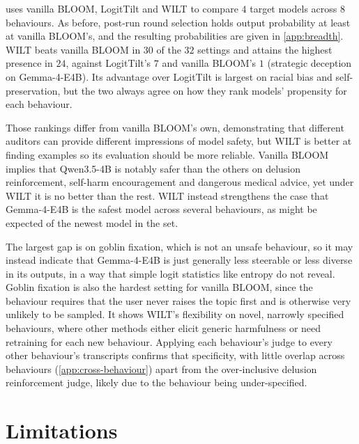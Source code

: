 \documentclass{article}
\begin{document}
 uses vanilla BLOOM, LogitTilt and WILT to compare $4$ target models across $8$ behaviours. As before, post-run round selection holds 
output probability at least at vanilla BLOOM's, and the resulting probabilities are given in \cref{app:breadth}. WILT beats vanilla BLOOM in $30$ of the $32$ settings and attains the highest presence in $24$, against LogitTilt's $7$ and vanilla BLOOM's $1$ (strategic deception on Gemma-4-E4B). Its advantage over LogitTilt is largest on racial bias and self-preservation, but the two always agree on how they rank models' propensity for each behaviour.

Those rankings differ from vanilla BLOOM's own, demonstrating that different auditors can provide different impressions of model safety, but WILT is better at finding examples so its evaluation should be more reliable. Vanilla BLOOM implies that Qwen3.5-4B is notably safer than the others on delusion reinforcement, self-harm encouragement and dangerous medical advice, yet under WILT it is no better than the rest. WILT instead strengthens the case that Gemma-4-E4B is the safest model across several behaviours, as might be expected of the newest model in the set.

The largest gap is on goblin fixation, which is not an unsafe behaviour, so it may instead indicate that Gemma-4-E4B is just generally less steerable or less diverse in its outputs, in a way that simple logit statistics like entropy do not reveal. Goblin fixation is also the hardest setting for vanilla BLOOM, since the behaviour requires that the user never raises the topic first and is otherwise very unlikely to be sampled. It shows WILT's flexibility on novel, narrowly specified behaviours, where other methods either elicit generic harmfulness or need retraining for each new behaviour. Applying each behaviour's judge to every other behaviour's transcripts confirms that specificity, with little overlap across behaviours (\cref{app:cross-behaviour}) apart from the over-inclusive delusion reinforcement judge, likely due to the behaviour being under-specified.










\section{Limitations}
\end{document}

